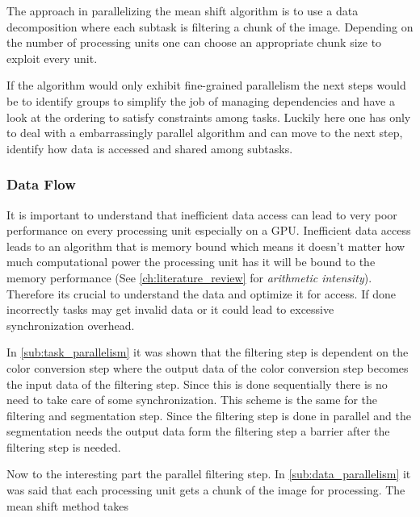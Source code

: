 The approach in parallelizing the mean shift algorithm is to use a data
decomposition where each subtask is filtering a chunk of the image. Depending on
the number of processing units one can choose an appropriate chunk size to
exploit every unit.

If the algorithm would only exhibit fine-grained parallelism the next steps would
be to identify groups to simplify the job of managing dependencies and have a 
look at the ordering to satisfy constraints among tasks. Luckily here one has only
to deal with a embarrassingly parallel algorithm and can move to the next step, 
identify how data is accessed and shared among subtasks. 

\subsubsection{Data Flow} %
\label{ssub:data_flow}

It is important to understand that inefficient data access can lead to very poor
performance on every processing unit especially on a \gls{GPU}. Inefficient data
access leads to an algorithm that is memory bound which means it doesn't matter
how much computational power the processing unit has it will be bound to the
memory performance (See \autoref{ch:literature_review} for \emph{arithmetic
intensity}). Therefore its crucial to understand the data and optimize it for
access. If done incorrectly tasks may get invalid data or it could lead to
excessive synchronization overhead. 

In \autoref{sub:task_parallelism} it was shown that the filtering step is
dependent on the color conversion step where the output data of the color
conversion step becomes the input data of the filtering step. Since this is done
sequentially there is no need to take care of some synchronization. This scheme
is the same for the filtering and segmentation step. Since the filtering step is
done in parallel and the segmentation needs the output data form the filtering
step a barrier after the filtering step is needed. 

Now to the interesting part the parallel filtering step. In
\autoref{sub:data_parallelism} it was said that each processing unit gets a chunk
of the image for processing. The mean shift method takes 






 

























